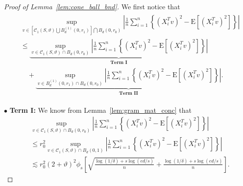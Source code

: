 \documentclass[ejsv2,noshowframe]{imsart}
\theoremstyle{plain}
\theoremstyle{definition}
\theoremstyle{remark}
\begin{document}
\begin{proof}[Proof of Lemma~\ref{lem:cone_ball_bnd}]
	We first notice that
	\begin{align}
		\label{cone_union_ball1}
		\begin{split}
			&\sup_{v\in \left[\mathcal{C}_1(S,\vartheta) \bigcup B_d^{(1)}(0,r_1) \right] \bigcap B_d(0,r_0)} \left|\frac{1}{n} \sum_{i=1}^n \left\{(X_i^Tv)^2 - \mathrm{E}\left[(X_i^Tv)^2\right] \right\}\right| \\
			&\leq \underbrace{\sup_{v\in \mathcal{C}_1(S,\vartheta) \cap B_d(0,r_0)} \left|\frac{1}{n} \sum_{i=1}^n \left\{(X_i^Tv)^2 - \mathrm{E}\left[(X_i^Tv)^2\right] \right\}\right|}_{\textbf{Term I}} \\
			&\quad + \underbrace{\sup_{v\in  B_d^{(1)}(0,r_1) \cap B_d(0,r_0)} \left|\frac{1}{n} \sum_{i=1}^n \left\{(X_i^Tv)^2 - \mathrm{E}\left[(X_i^Tv)^2\right] \right\}\right|}_{\textbf{Term II}}.
		\end{split}
	\end{align}
	
	$\bullet$ {\bf Term I:} We know from Lemma~\ref{lem:gram_mat_conc} that
	\begin{align*}
		&\sup_{v\in \mathcal{C}_1(S,\vartheta) \cap B_d(0,r_0)} \left|\frac{1}{n} \sum_{i=1}^n \left\{(X_i^Tv)^2 - \mathrm{E}\left[(X_i^Tv)^2\right] \right\}\right| \\
		&\leq r_0^2 \sup_{v\in \mathcal{C}_1(S,\vartheta) \cap B_d(0,1)} \left|\frac{1}{n} \sum_{i=1}^n \left\{(X_i^Tv)^2 - \mathrm{E}\left[(X_i^Tv)^2\right] \right\}\right| \\
		&\lesssim r_0^2 (2+\vartheta)^2 \phi_s\left[\sqrt{\frac{\log(1/\delta) + s\log(ed/s)}{n}} + \frac{\log(1/\delta)  + s\log(ed/s)}{n} \right].
	\end{align*}
	

\end{proof}
\end{document}
